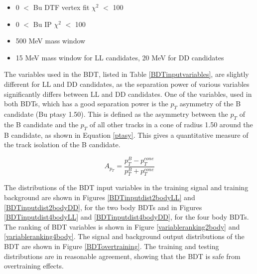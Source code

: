 \begin{itemize}
\item{0 $<$ Bu DTF vertex fit $\chi^2$ $<$ 100}
\item{0 $<$ Bu IP $\chi^2$ $<$ 100}
\item{500 MeV \Kstarm mass window}
\item{15 MeV \KS mass window for LL candidates, 20 MeV for DD candidates}
\end{itemize}

The variables used in the BDT, listed in Table \ref{BDTinputvariables}, are slightly different for LL and DD candidates, as the separation power of various \KS variables significantly differs between LL and DD candidates. One of the variables, used in both BDTs, which has a good separation power is the $p_T$ asymmetry of the B candidate (Bu ptasy 1.50). This is defined as the asymmetry between the $p_T$ of the B candidate and the $p_T$ of all other tracks in a cone of radius 1.50 around the B candidate, as shown in Equation \ref{ptasy}. This gives a quantitative measure of the track isolation of the B candidate. 

\begin{equation}
A_{p_T} = \frac{p_T^B - p_T^{cone}}{p_T^B + p_T^{cone}}
\label{ptasy}
\end{equation}

The distributions of the BDT input variables in the training signal and training background are shown in Figures \ref{BDTinputdist2bodyLL} and \ref{BDTinputdist2bodyDD}, for the two body BDTs and in Figures \ref{BDTinputdist4bodyLL} and \ref{BDTinputdist4bodyDD}, for the four body BDTs. The ranking of BDT variables is shown in Figure \ref{variableranking2body} and \ref{variableranking4body}. The signal and background output distributions of the BDT are shown in Figure \ref{BDTovertraining}. The training and testing distributions are in reasonable agreement, showing that the BDT is safe from overtraining effects.

